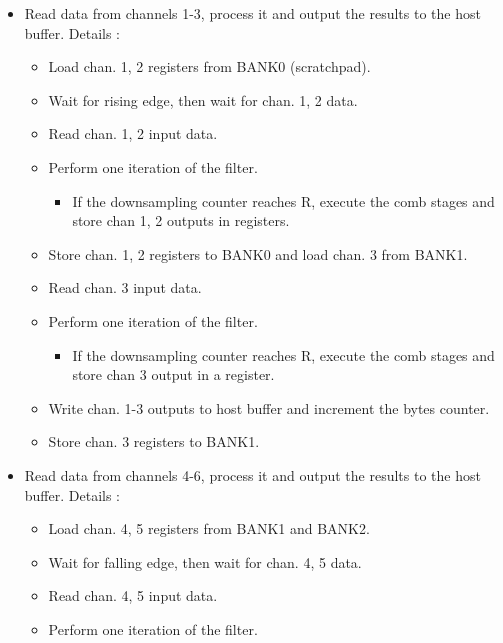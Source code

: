 \documentclass[]{report}
\providecommand{\tightlist}{%
	\setlength{\itemsep}{0pt}\setlength{\parskip}{0pt}}
\begin{document}
\begin{itemize}
\tightlist
\item
  Read data from channels 1-3, process it and output the results to the
  host buffer. Details :

  \begin{itemize}
  \tightlist
  \item
    Load chan. 1, 2 registers from BANK0 (scratchpad).
  \item
    Wait for rising edge, then wait for chan. 1, 2 data.
  \item
    Read chan. 1, 2 input data.
  \item
    Perform one iteration of the filter.

    \begin{itemize}
    \tightlist
    \item
      If the downsampling counter reaches R, execute the comb stages and
      store chan 1, 2 outputs in registers.
    \end{itemize}
  \item
    Store chan. 1, 2 registers to BANK0 and load chan. 3 from BANK1.
  \item
    Read chan. 3 input data.
  \item
    Perform one iteration of the filter.

    \begin{itemize}
    \tightlist
    \item
      If the downsampling counter reaches R, execute the comb stages and
      store chan 3 output in a register.
    \end{itemize}
  \item
    Write chan. 1-3 outputs to host buffer and increment the bytes counter.
  \item
    Store chan. 3 registers to BANK1.
  \end{itemize}
\item
   Read data from channels 4-6, process it and output the results to the
   host buffer. Details :

  \begin{itemize}
  \tightlist
  \item
    Load chan. 4, 5 registers from BANK1 and BANK2.
  \item
    Wait for falling edge, then wait for chan. 4, 5 data.
  \item
    Read chan. 4, 5 input data.
  \item
    Perform one iteration of the filter.


\end{itemize}
\end{itemize}
\end{document}
